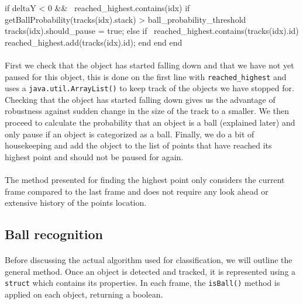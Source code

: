 \documentclass[10pt,a4paper]{article}
\begin{document}
\begin{samepage}
\begin{verbatimtab}
if deltaY < 0 && ~reached_highest.contains(idx)
	if getBallProbability(tracks(idx).stack) > ball_probability_threshold
		tracks(idx).should_pause = true;
	else
		if ~reached_highest.contains(tracks(idx).id)
			reached_highest.add(tracks(idx).id);
		end
	end
end
\end{verbatimtab}
\end{samepage}

\paragraph{} First we check that the object has started falling down and that we have not yet paused for this object, this is done on the first line with \texttt{reached\_highest} and uses a \texttt{java.util.ArrayList()} to keep track of the objects we have stopped for. Checking that the object has started falling down gives us the advantage of robustness against sudden change in the size of the track to a smaller. We then proceed to calculate the probability that an object is a ball (explained later) and only pause if an object is categorized as a ball. Finally, we do a bit of housekeeping and add the object to the list of points that have reached its highest point and should not be paused for again.

\paragraph{} The method presented for finding the highest point only considers the current frame compared to the last frame and does not require any look ahead or extensive history of the points location.

\subsection{Ball recognition}

\paragraph{} Before discussing the actual algorithm used for classification, we will outline the general method. Once an object is detected and tracked, it is represented using a \texttt{struct} which contains its properties. In each frame, the \texttt{isBall()} method is applied on each object, returning a boolean. 
\end{document}
